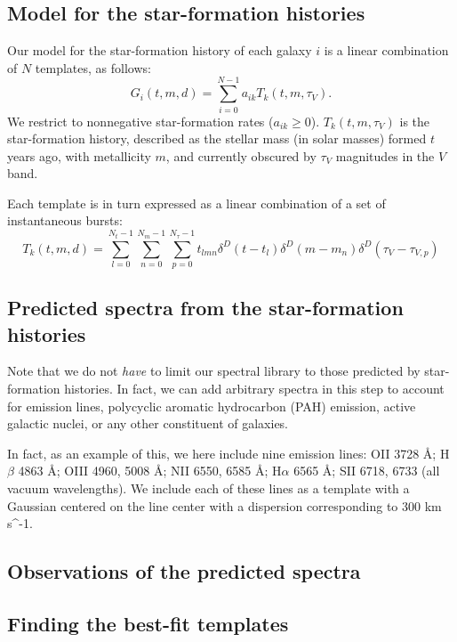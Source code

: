 \documentclass[10pt]{aastex}
\begin{document}
\subsection{Model for the star-formation histories}
\label{model}

Our model for the star-formation history of each galaxy $i$ is a linear
combination of $N$ templates, as follows:
\begin{equation}
G_i(t, m, d) = \sum_{i=0}^{N-1} a_{ik} T_k(t, m, \tau_V).
\end{equation}
We restrict to nonnegative star-formation rates ($a_{ik} \ge
0$). $T_k(t, m, \tau_V)$ is the star-formation history, described as
the stellar mass (in solar masses) formed $t$ years ago, with
metallicity $m$, and currently obscured by $\tau_V$ magnitudes in the
$V$ band.

Each template is in turn expressed as a linear combination of a set of
instantaneous bursts:
\begin{equation}
T_k(t, m, d) = 
\sum_{l=0}^{N_t-1} 
\sum_{n=0}^{N_m-1} 
\sum_{p=0}^{N_\tau-1} 
t_{lmn} 
\delta^D(t-t_l)
\delta^D(m-m_n)
\delta^D(\tau_V-\tau_{V,p})
\end{equation}



\subsection{Predicted spectra from the star-formation histories}
\label{spectra}


Note that we do not {\it have} to limit our spectral library to those
predicted by star-formation histories. In fact, we can add arbitrary
spectra in this step to account for emission lines, polycyclic
aromatic hydrocarbon (PAH) emission, active galactic nuclei, or any
other constituent of galaxies. 

In fact, as an example of this, we here include nine emission lines:
OII 3728 \AA; H$\beta$ 4863 \AA; OIII 4960, 5008 \AA; NII 6550, 6585
\AA; H$\alpha$ 6565 \AA; SII 6718, 6733 (all vacuum wavelengths). We
include each of these lines as a template with a Gaussian centered on
the line center with a dispersion corresponding to 300 km s^{-1}.

\subsection{Observations of the predicted spectra}
\label{observe}

\subsection{Finding the best-fit templates}
\label{nmf}
\end{document}
